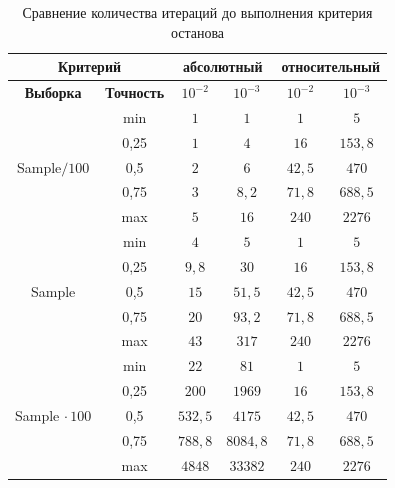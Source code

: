 


\begin{table}[!hhh]
 \caption{Сравнение количества итераций до выполнения критерия останова}
   \label{table: abs_rel_crit_iter}
\centering
\begin{tabular}{|c|c|c|c|c|c|}
\hline
\multicolumn{2}{|c|}{\textbf{Критерий}} & \multicolumn{2}{c|}{\textbf{абсолютный}} & \multicolumn{2}{c|}{\textbf{относительный}} \\
\hline
\textbf{Выборка} & \textbf{Точность} & $10^{-2}$ & $10^{-3}$ & $10^{-2}$ & $10^{-3}$ \\
\hline
\multirow{5}{*}{Sample$/100$} & min & $1$ & $1$ & $1$ & $5$ \\
\cline{2-6}
& 0,25 & $1$ & $4$ & $16$ & $153,8$ \\
\cline{2-6}
& 0,5 & $2$ & $6$ & $42,5$ & $470$ \\
\cline{2-6}
& 0,75 & $3$ & $8,2$ & $71,8$ & $688,5$ \\
\cline{2-6}
& max & $5$ & $16$ & $240$ & $2276$ \\
\hline

\multirow{5}{*}{Sample} & min & $4$ & $5$ & $1$ & $5$ \\
\cline{2-6}
& 0,25 & $9,8$ & $30$ & $16$ & $153,8$ \\
\cline{2-6}
& 0,5 & $15$ & $51,5$ & $42,5$ & $470$ \\
\cline{2-6}
& 0,75 & $20$ & $93,2$ & $71,8$ & $688,5$ \\
\cline{2-6}
& max & $43$ & $317$ & $240$ & $2276$ \\
\hline

\multirow{5}{*}{Sample$\, \cdot 100$} & min & $22$ & $81$ & $1$ & $5$ \\
\cline{2-6}
& 0,25 & $200$ & $1969$ & $16$ & $153,8$ \\
\cline{2-6}
& 0,5 & $532,5$ & $4175$ & $42,5$ & $470$ \\
\cline{2-6}
& 0,75 & $788,8$ & $8084,8$ & $71,8$ & $688,5$ \\
\cline{2-6}
& max & $4848$ & $33382$ & $240$ & $2276$ \\
\hline
\end{tabular}
\end{table}



